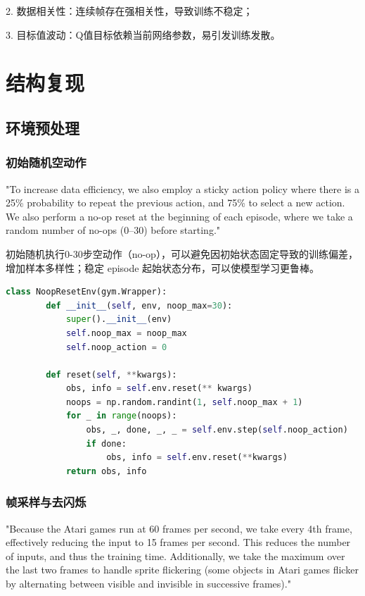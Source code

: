 \documentclass[conference]{IEEEtran}
\begin{document}
	2. 数据相关性：连续帧存在强相关性，导致训练不稳定\cite{3}；
	
	3. 目标值波动：Q值目标依赖当前网络参数，易引发训练发散\cite{3}。
	
	\section{结构复现}
	\subsection{环境预处理}
	\subsubsection{初始随机空动作}
	
	"To increase data efficiency, we also employ a sticky action policy where there is a 25\% probability to repeat the previous action, and 75\% to select a new action. We also perform a no-op reset at the beginning of each episode, where we take a random number of no-ops (0–30) before starting.\cite{1}" 
	 
	初始随机执行0-30步空动作（no-op），可以避免因初始状态固定导致的训练偏差，增加样本多样性；稳定 episode 起始状态分布，可以使模型学习更鲁棒。
	\begin{lstlisting}[language=Python,caption=NoopResetEnv]
	class NoopResetEnv(gym.Wrapper):
		def __init__(self, env, noop_max=30):
			super().__init__(env)
			self.noop_max = noop_max 
			self.noop_action = 0  
	
		def reset(self, **kwargs):
			obs, info = self.env.reset(** kwargs)
			noops = np.random.randint(1, self.noop_max + 1)
			for _ in range(noops):
				obs, _, done, _, _ = self.env.step(self.noop_action)
				if done:
					obs, info = self.env.reset(**kwargs)
			return obs, info
    \end{lstlisting}
    
    \subsubsection{帧采样与去闪烁}
    
    "Because the Atari games run at 60 frames per second, we take every 4th frame, effectively reducing the input to 15 frames per second. This reduces the number of inputs, and thus the training time. Additionally, we take the maximum over the last two frames to handle sprite flickering (some objects in Atari games flicker by alternating between visible and invisible in successive frames).\cite{1}"  
    
\end{document}
